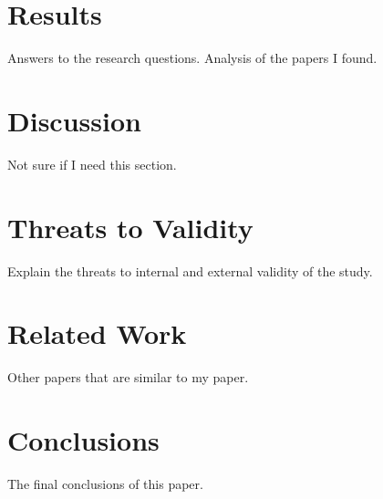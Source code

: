 \section{Results}
Answers to the research questions.
Analysis of the papers I found.

\section{Discussion}
Not sure if I need this section.

\section{Threats to Validity}
Explain the threats to internal and external validity of the study.

\section{Related Work}
Other papers that are similar to my paper.

\section{Conclusions}
The final conclusions of this paper.



